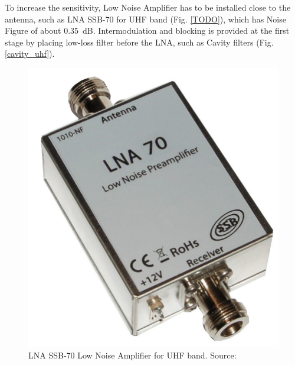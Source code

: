 To increase the sensitivity, Low Noise Amplifier has to be installed close to the antenna, such as LNA SSB-70 for UHF band (Fig. \ref{TODO}), which has Noise Figure of about \SI{0.35}{\dB}. Intermodulation and blocking is provided at the first stage by placing low-loss filter before the LNA, such as Cavity filters (Fig. \ref{cavity_uhf}).

\begin{minipage}{\linewidth}
    \centering
    \begin{minipage}{0.45\linewidth}
        \begin{figure}[H]
            \centering
            \includegraphics[width=0.3\paperwidth]{img/2/ssb_lna70.jpg}
            \caption{LNA SSB-70 Low Noise Amplifier for UHF band. Source: \cite{ssb_lna70}}
            \label{ssb_lna70}
        \end{figure}
    \end{minipage}
    \hspace{0.05\linewidth}
    \begin{minipage}{0.45\linewidth}
        \begin{figure}[H]
            \centering

\end{figure}
\end{minipage}
\end{minipage}
